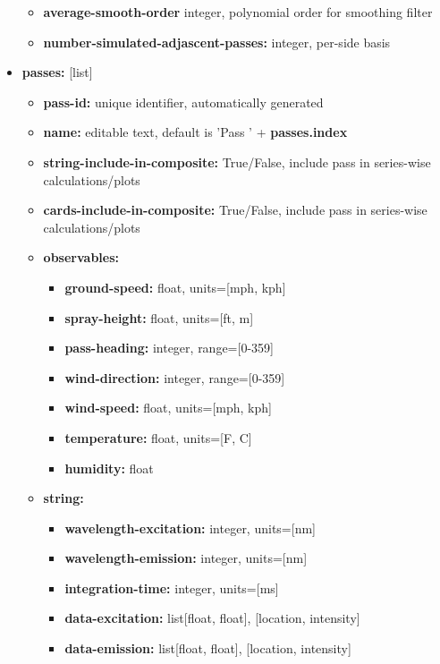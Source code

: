 \documentclass[10pt,letterpaper,titlepage]{article}
\begin{document}
\begin{itemize}
\begin{itemize}
            \item \textbf{average-smooth-order} integer, polynomial order for smoothing filter
            \item \textbf{number-simulated-adjascent-passes:} integer, per-side basis
        \end{itemize}
        \item \textbf{passes:} [list]
        \begin{itemize}
            \item \textbf{pass-id:} unique identifier, automatically generated
            \item \textbf{name:} editable text, default is 'Pass ' + \textbf{passes.index}
            \item \textbf{string-include-in-composite:} True/False, include pass in series-wise calculations/plots
            \item \textbf{cards-include-in-composite:} True/False, include pass in series-wise calculations/plots
            \item \textbf{observables:} 
            \begin{itemize}
                \item \textbf{ground-speed:} float, units=[mph, kph]
                \item \textbf{spray-height:} float, units=[ft, m]
                \item \textbf{pass-heading:} integer, range=[0-359]
                \item \textbf{wind-direction:} integer, range=[0-359]
                \item \textbf{wind-speed:} float, units=[mph, kph]
                \item \textbf{temperature:} float, units=[\degree F, \degree C]
                \item \textbf{humidity:} float
            \end{itemize}
            \item \textbf{string:} 
            \begin{itemize}
                \item \textbf{wavelength-excitation:} integer, units=[nm]
                \item \textbf{wavelength-emission:} integer, units=[nm]
                \item \textbf{integration-time:} integer, units=[ms]
                \item \textbf{data-excitation:} list[float, float], [location, intensity]
                \item \textbf{data-emission:} list[float, float], [location, intensity]

\end{itemize}
\end{itemize}
\end{itemize}
\end{document}
